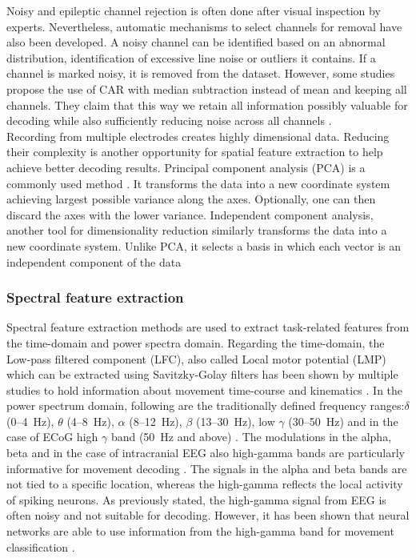 Noisy and epileptic channel rejection is often done after visual inspection by experts. Nevertheless, automatic mechanisms to select channels for removal have also been developed. A noisy channel can be identified based on an abnormal distribution, identification of excessive line noise or outliers it contains. If a channel is marked noisy, it is removed from the dataset. However, some studies propose the use of CAR with median subtraction instead of mean and keeping all channels. They claim that this way we retain all information possibly valuable for decoding while also sufficiently reducing noise across all channels \cite{liu-effects-2015}. \\

Recording from multiple electrodes creates highly dimensional data. Reducing their complexity is another opportunity for spatial feature extraction to help achieve better decoding results. Principal component analysis (PCA) is a commonly used method \cite{}. It transforms the data into a new coordinate system achieving largest possible variance along the axes. Optionally, one can then discard the axes with the lower variance. Independent component analysis, another tool for dimensionality reduction similarly transforms the data into a new coordinate system. Unlike PCA, it selects a basis in which each vector is an independent component of the data \cite{ica}

\subsubsection{Spectral feature extraction}
Spectral feature extraction methods are used to extract task-related features from the time-domain and power spectra domain. Regarding the time-domain, the Low-pass filtered component (LFC), also called Local motor potential (LMP) which can be extracted using Savitzky-Golay filters \cite{multitaper-31} has been shown by multiple studies to hold information about movement time-course and kinematics \cite{schalk-2007, Pistohl2008PredictionOA, ball-2019}. In the power spectrum domain, following are the traditionally defined frequency ranges:$\delta$ (0–4~Hz), $\theta$ (4–8~Hz), $\alpha$ (8–12~Hz), $\beta$ (13–30~Hz), low $\gamma$ (30–50~Hz) and in the case of ECoG high $\gamma$ band (50~Hz and above) \cite{hammer-predominance-2016}. The modulations in the alpha, beta and in the case of intracranial EEG also high-gamma bands are particularly informative for movement decoding \cite{ball-hg-importance, 34-gunduz-hg}. The signals in the alpha and beta bands are not tied to a specific location, whereas the high-gamma reflects the local activity of spiking neurons. As previously stated, the high-gamma signal from EEG is often noisy and not suitable for decoding. However, it has been shown that neural networks are able to use information from the high-gamma band for movement classification \cite{schirrmeister-deep-2017}.  \\

